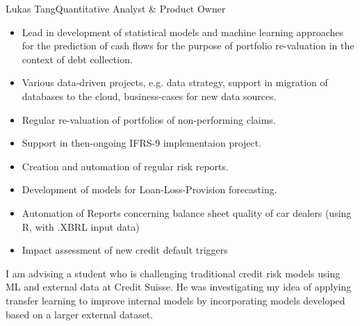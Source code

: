 \documentclass{article}
\begin{document}
\begin{cv}[avatar]{Lukas Tang}{Quantitative Analyst \& Product Owner}
\begin{cvevent}[07/2018][02/2021]
    \begin{itemize}
        \item Lead in development of statistical models and machine learning approaches for the prediction of cash flows for the purpose of portfolio re-valuation in the context of debt collection.
        \item Various data-driven projects, e.g. data strategy, support in migration of databases to the cloud, business-cases for new data sources. 
        \item Regular re-valuation of portfolios of non-performing claims.
    \end{itemize}
\end{cvevent}

\begin{cvevent}[09/2016][06/2018]
    \begin{itemize}
        \item Support in then-ongoing IFRS-9 implementaion project.
        \item Creation and automation of regular risk reports.
        \item Development of models for Loan-Loss-Provision forecasting.
    \end{itemize}
\end{cvevent}

\begin{cvevent}[09/2015][02/2016]
    \begin{itemize}
        \item Automation of Reports concerning balance sheet quality of car dealers (using R, with .XBRL input data)
        \item Impact assessment of new credit default triggers 
    \end{itemize}
\end{cvevent}




\begin{cvevent}[2023]
    I am advising a student who is challenging traditional credit risk models using ML and external data at Credit Suisse. He was investigating my idea of applying transfer learning to improve internal models by incorporating models developed based on a larger external dataset.
\end{cvevent}


\end{cv}
\end{document}
